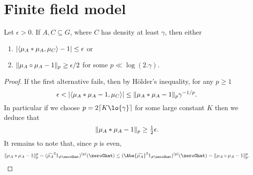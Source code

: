 \chapter{Finite field model}

\begin{lemma}\label{global_dichotomy}
Let $\epsilon >0$. If $A,C\subseteq G$, where $C$ has density at least $\gamma$, then either
\begin{enumerate}
\item  $\left\lvert \langle \mu_A\ast \mu_A,\mu_C\rangle -1\right\rvert\leq \epsilon$ or
\item $\lVert \mu_A\circ \mu_A-1\rVert_p \geq \epsilon/2$ for some $p\ll\log(2.\gamma)$.
\end{enumerate}
\end{lemma}
\begin{proof}
If the first alternative fails, then by H\"{o}lder's inequality, for any $p\geq 1$
\[\epsilon < \left\lvert  \langle \mu_A \ast \mu_A - 1, \mu_C \rangle \right\rvert \leq \lVert \mu_A\ast \mu_A-1\rVert_p\gamma^{-1/p}.\]
In particular if we choose $p=2\lceil K\lo{\gamma}\rceil$ for some large constant $K$ then we deduce that
\[\lVert \mu_A\ast \mu_A-1\rVert_{p}\geq \tfrac{1}{2}\epsilon.\]
It remains to note that, since $p$ is even,
\[\norm{\mu_A\ast \mu_A-1}_{p}^p=(\widehat{\mu_A}^2\ind{\neq \zeroGhat})^{(p)}(\zeroGhat)\leq(\Abs{\widehat{\mu_A}}^2\ind{\neq \zeroGhat})^{(p)}(\zeroGhat)=\norm{\mu_A\circ \mu_A-1}_p^p. \qedhere \]
\end{proof}


